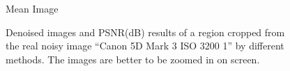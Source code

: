 \begin{figure}
{\begin{minipage}[t]{0.19\textwidth}
{\footnotesize Mean Image}
\end{minipage}
}
    \caption{Denoised images and PSNR(dB) results of a region cropped from the real noisy image ``Canon 5D Mark 3 ISO 3200 1'' \cite{crosschannel2016} by different methods. The images are better to be zoomed in on screen.}
    \label{fig3-12}
\end{figure}


